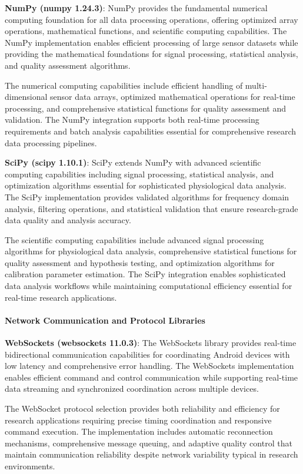 \documentclass[11pt,a4paper]{article}
\begin{document}
\textbf{NumPy (numpy 1.24.3)}: NumPy provides the fundamental numerical computing foundation for all data processing
operations, offering optimized array operations, mathematical functions, and scientific computing capabilities. The
NumPy implementation enables efficient processing of large sensor datasets while providing the mathematical foundations
for signal processing, statistical analysis, and quality assessment algorithms.

The numerical computing capabilities include efficient handling of multi-dimensional sensor data arrays, optimized
mathematical operations for real-time processing, and comprehensive statistical functions for quality assessment and
validation. The NumPy integration supports both real-time processing requirements and batch analysis capabilities
essential for comprehensive research data processing pipelines.

\textbf{SciPy (scipy 1.10.1)}: SciPy extends NumPy with advanced scientific computing capabilities including signal
processing, statistical analysis, and optimization algorithms essential for sophisticated physiological data analysis.
The SciPy implementation provides validated algorithms for frequency domain analysis, filtering operations, and
statistical validation that ensure research-grade data quality and analysis accuracy.

The scientific computing capabilities include advanced signal processing algorithms for physiological data analysis,
comprehensive statistical functions for quality assessment and hypothesis testing, and optimization algorithms for
calibration parameter estimation. The SciPy integration enables sophisticated data analysis workflows while maintaining
computational efficiency essential for real-time research applications.

\paragraph{Network Communication and Protocol Libraries}

\textbf{WebSockets (websockets 11.0.3)}: The WebSockets library provides real-time bidirectional communication capabilities
for coordinating Android devices with low latency and comprehensive error handling. The WebSockets implementation
enables efficient command and control communication while supporting real-time data streaming and synchronized
coordination across multiple devices.

The WebSocket protocol selection provides both reliability and efficiency for research applications requiring precise
timing coordination and responsive command execution. The implementation includes automatic reconnection mechanisms,
comprehensive message queuing, and adaptive quality control that maintain communication reliability despite network
variability typical in research environments.
\end{document}
